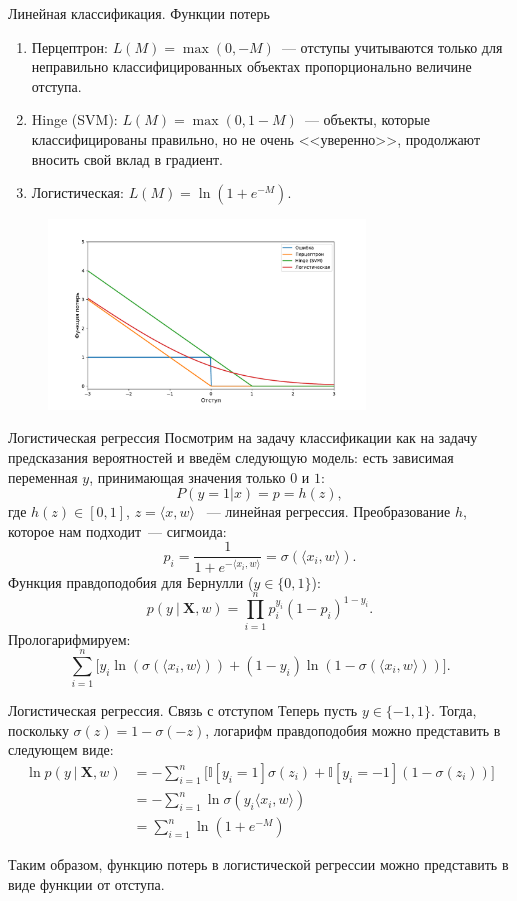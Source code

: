 \documentclass[notheorems, handout]{beamer}
\begin{document}
\begin{frame}{Линейная классификация. Функции потерь}
  \begin{enumerate}
    \item Перцептрон: $L(M) = \max(0, -M)$~--- отступы учитываются
      только для неправильно классифицированных объектах
      пропорционально величине отступа.
    \item Hinge (SVM): $L(M) = \max(0, 1-M)$~--- объекты, которые
      классифицированы правильно, но не очень <<уверенно>>,
      продолжают вносить свой вклад в градиент.
    \item Логистическая: $L(M) = \ln\left(1+e^{-M}\right)$.
  \end{enumerate}
  \begin{figure}
    \includegraphics[width=0.75\textwidth]{img/loss_major.pdf}
  \end{figure}
\end{frame}

\begin{frame}{Логистическая регрессия}
  Посмотрим на задачу классификации как на задачу предсказания
  вероятностей и введём следующую модель: есть зависимая переменная
  $y$, принимающая значения только $0$ и $1$:
  \[
    P (y = 1|x) = p = h(z),
  \]
  где $h(z) \in [0, 1]$, $z = \langle x, w\rangle$ ~--- линейная
  регрессия. Преобразование $h$, которое нам подходит~--- сигмоида:
  \[
    p_i = \frac{1}{1+e^{-\langle x_i, w\rangle}}=\sigma(\langle x_i, w\rangle).
  \]
  Функция правдоподобия для Бернулли ($y \in \{0, 1\}$):
  \[
    p(y~|~\mathbf{X}, w)=\prod_{i=1}^np_i^{y_i}(1-p_i)^{1-y_i}.
  \]
  Прологарифмируем:
  \[
    \sum_{i=1}^n\Big[y_i\ln(\sigma(\langle x_i, w\rangle)) +
    (1-y_i)\ln(1-\sigma(\langle x_i, w\rangle))\Big].
  \]
\end{frame}

\begin{frame}{Логистическая регрессия. Связь с отступом}
  Теперь пусть $y\in\{-1, 1\}$. Тогда, поскольку
  $\sigma(z)=1-\sigma(-z)$, логарифм правдоподобия можно представить
  в следующем виде:
  \begin{align*}
    \ln p (y~|~ \mathbf{X}, w) & =
    -\sum_{i=1}^n\Big[\mathbb{I}[y_i=1]\sigma(z_i)+\mathbb{I}[y_i=-1]\left(1-\sigma(z_i)\right)\Big]
    \\
    & = -\sum_{i=1}^n \ln\sigma(y_i\langle x_i, w\rangle)
    \\
    & = \sum_{i=1}^n \ln\left(1 + e^{-M}\right)
  \end{align*}

  Таким образом, функцию потерь в логистической регрессии можно
  представить в виде функции от отступа.
\end{frame}
\end{document}
